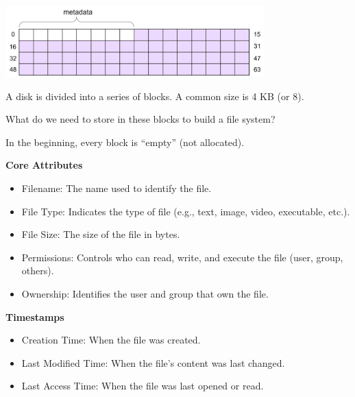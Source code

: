 \begin{slide}


    \includegraphics[width=100mm]{VSFS-1.png}
    \bigskip

    A disk is divided into a series of blocks. A common size is 4 KB (or 8).
    \bigskip

    What do we need to store in these blocks to build a file system?
    \bigskip

    In the beginning, every block is “empty” (not allocated).

\end{slide}

\begin{slide}

    \bigskip

    \textbf{Core Attributes}
    \begin{itemize}
        \item Filename: The name used to identify the file.
        \item File Type: Indicates the type of file (e.g., text, image, video, executable, etc.).
        \item File Size: The size of the file in bytes.
        \item Permissions: Controls who can read, write, and execute the file (user, group, others).
        \item Ownership: Identifies the user and group that own the file.
    \end{itemize}
    \bigskip

    \textbf{Timestamps}
    \begin{itemize}
        \item Creation Time: When the file was created.
        \item Last Modified Time: When the file's content was last changed.
        \item Last Access Time: When the file was last opened or read.
    \end{itemize}

\end{slide}

